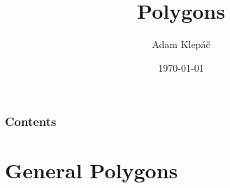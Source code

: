\documentclass[aspectratio=169,11pt,svgnames,draft]{beamer}
\title{Polygons}
\date{\today}
\author{Adam Klepáč}
\institute[GEVO]{Gymnázium Evolution Jižní Město}
\begin{document}
\titleframe

\begin{frame}
 \frametitle{Contents}
 \tableofcontents
\end{frame}

\section{General Polygons}
\label{sec:general-polygons}

%
%
%
\end{document}
